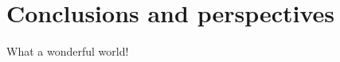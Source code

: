 \documentclass[10pt,showpacs,preprintnumbers,footinbib,amsmath,amssymb,aps,prl,twocolumn,groupedaddress,superscriptaddress,showkeys]{revtex4-1}
\begin{document}
\section{Conclusions and perspectives}
What a wonderful world!

\end{document}
